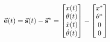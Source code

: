 \documentclass[
    crop,
    margin=0.05in,
    convert={density=150}
]{standalone}
\begin{document}
    $\displaystyle
        \va{e}(t) = \va{s}(t) - \va{s}^* = \mqty[x(t)\\ \theta(t) \\ \dot{x}(t) \\ \dot{\theta}(t)] - \mqty[x^* \\ \theta^* \\ 0 \\ 0]
    $
\end{document}
